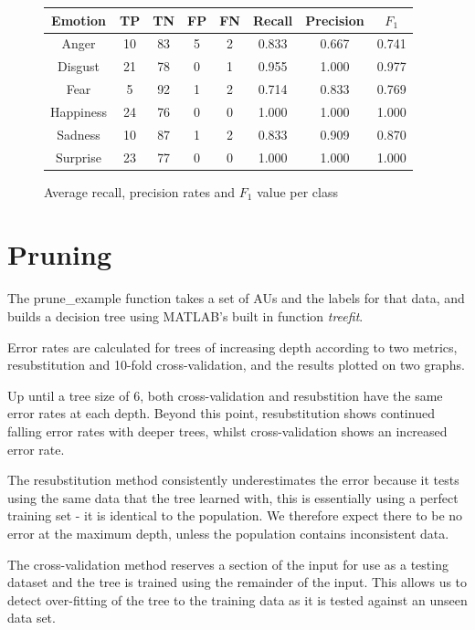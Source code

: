\documentclass[a4paper]{article}
\begin{document}
\begin{figure}
  \centering
  \begin{tabular}{c|cccc|ccc}
    Emotion & TP & TN & FP & FN & Recall & Precision & $F_1$ \\
    \hline
    Anger & 10 & 83 & 5 & 2 & 0.833 & 0.667 & 0.741 \\
  Disgust & 21 & 78 & 0 & 1 & 0.955 & 1.000 & 0.977 \\
     Fear & 5 & 92 & 1 & 2 & 0.714 & 0.833 & 0.769 \\
Happiness & 24 & 76 & 0 & 0 & 1.000 & 1.000 & 1.000 \\
  Sadness & 10 & 87 & 1 & 2 & 0.833 & 0.909 & 0.870 \\
 Surprise & 23 & 77 & 0 & 0 & 1.000 & 1.000 & 1.000 \\
  \end{tabular}
  \caption{Average recall, precision rates and $F_1$ value per class}
  \label{table:thing}
\end{figure}

\section{Pruning}
The prune\_example function takes a set of AUs and the labels for that data,
and builds a decision tree using MATLAB's built in function \emph{treefit}.

Error rates are calculated for trees of increasing depth according to two
metrics, resubstitution and 10-fold cross-validation, and the results
plotted on two graphs.

Up until a tree size of 6, both cross-validation and resubstition have the
same error rates at each depth. Beyond this point, resubstitution shows
continued falling error rates with deeper trees, whilst cross-validation
shows an increased error rate.

The resubstitution method consistently underestimates the error because it
tests using the same data that the tree learned with, this is essentially
using a perfect training set - it is identical to the population. We
therefore expect there to be no error at the maximum depth, unless the
population contains inconsistent data.

The cross-validation method reserves a section of the input for use as a
testing dataset and the tree is trained using the remainder of the input.
This allows us to detect over-fitting of the tree to the training data as it
is tested against an unseen data set.
\end{document}
